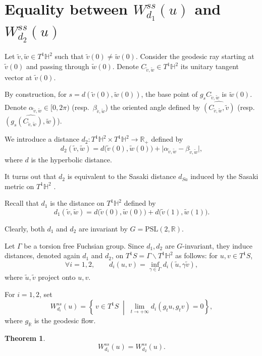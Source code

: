 \documentclass[a4paper,english,reqno]{amsart}
\newcommand{\R}{\mathbb{R}}
\newtheorem{theorem}{Theorem}%
\theoremstyle{definition}
\numberwithin{equation}{section}
\begin{document}
\appendix

\section{Equality between $W_{d_1}^{ss}(u)$ and $W_{d_2}^{ss}(u)$}\label{apendice}

Let $\tilde v,\tilde w\in T^{1}\mathbb H^{2}$ such that $\tilde v(0)\neq \tilde w(0)$.
Consider the geodesic ray starting at $\tilde v(0)$ and passing through $\tilde w(0)$.
Denote $C_{\tilde v,\tilde w}\in T^{1}\mathbb H^{2}$ its unitary tangent vector at $\tilde v(0)$.

By construction, for $s=d(\tilde v(0),\tilde w(0))$, the base point of $g_{s}C_{\tilde v,\tilde w}$ is $\tilde w(0)$.
Denote $\alpha_{\tilde v,\tilde w}\in[0,2\pi)$ (resp.\ $\beta_{\tilde v,\tilde w}$) the oriented angle
defined by $\widehat{(C_{\tilde v,\tilde w},\tilde v)}$ (resp.\ $\widehat{\left(g_{s}(C_{\tilde v,\tilde w}),\tilde w\right)}$).

We introduce a distance
$ 
d_{2}:T^{1}\mathbb H^{2}\times T^{1}\mathbb H^{2}\longrightarrow \mathbb R_{+}
$
defined by
\[
d_{2}(\tilde v,\tilde w)=d\bigl(\tilde v(0),\tilde w(0)\bigr)+\bigl|\alpha_{\tilde v,\tilde w}-\beta_{\tilde v,\tilde w}\bigr|,
\]
where $d$ is the hyperbolic distance.

It turns out that $d_{2}$ is equivalent to the Sasaki distance $d_{Sa}$ induced by the
Sasaki metric on $T^{1}\mathbb H^{2}$ \cite{Sasaki}.

Recall that $d_{1}$ is the distance on $T^{1}\mathbb H^{2}$ defined by
\[
d_{1}(\tilde v,\tilde w)=d\bigl(\tilde v(0),\tilde w(0)\bigr)+d\bigl(\tilde v(1),\tilde w(1)\bigr).
\]

Clearly, both $d_{1}$ and $d_{2}$ are invariant by $G=\mathrm{PSL}(2,\mathbb R)$.

Let $\Gamma$ be a torsion free 
Fuchsian group.
Since $d_{1},d_{2}$ are $G$-invariant, they induce distances, denoted again $d_{1}$ and $d_{2}$,
on $T^{1}S=\Gamma\backslash T^{1}\mathbb H^{2}$ as follows: for $u,v\in T^{1}S$,
\[
\forall i=1,2,\qquad d_{i}(u,v)=\inf_{\gamma\in\Gamma} d_{i}(\tilde u,\gamma\tilde v),
\]
where $\tilde u,\tilde v$ project onto $u,v$.

For $i=1,2$, set
\[
W_{d_{i}}^{ss}(u)=\left\{\,v\in T^{1}S\;\middle|\; \lim\limits_{t\to+\infty} d_{i}(g_{t}u,g_{t}v)=0 \right\},
\]
where $g_{\R}$ is the geodesic flow.

\begin{theorem}\label{equiv_stable_sets}
	\[
	W_{d_{1}}^{ss}(u)=W_{d_{2}}^{ss}(u).
	\]
\end{theorem}
\end{document}
